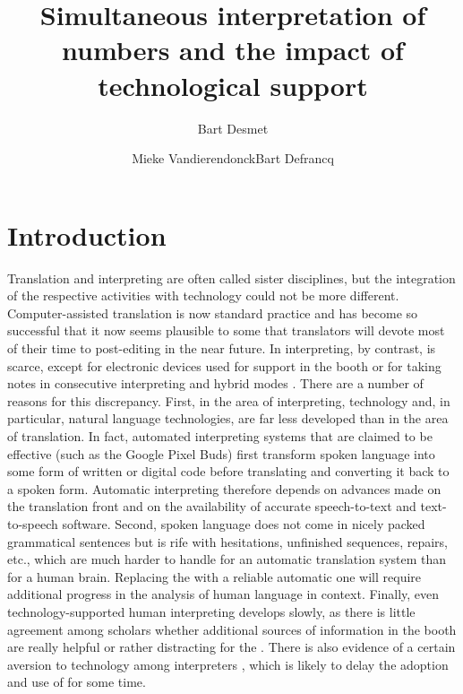 \documentclass[output=paper]{langsci/langscibook}
\title{Simultaneous interpretation of numbers and the impact of technological support}
\author{Bart Desmet\affiliation{University of Ghent}\and Mieke Vandierendonck\affiliation{University of Ghent}\lastand Bart Defrancq\affiliation{University of Ghent}}
\begin{document}

 

 
\section{Introduction}
Translation and interpreting are often called sister disciplines, but the integration of the respective activities with technology could not be more different. Computer-assisted translation is now standard practice and  has become so successful that it now seems plausible to some that translators will devote most of their time to post-editing in the near future. In interpreting, by contrast,  is scarce, except for electronic devices used for  support in the booth \citep{Fantinuoli2012} or for taking notes in consecutive interpreting and hybrid modes \citep{Orlando2014,Orlando2016,Goldsmith2017}. There are a number of reasons for this discrepancy. First, in the area of interpreting, technology and, in particular, natural language technologies, are far less developed than in the area of translation. In fact, automated interpreting systems that are claimed to be effective (such as the Google Pixel Buds) first transform spoken language into some form of written or digital code before translating and converting it back to a spoken form. Automatic interpreting therefore depends on advances made on the translation front and on the availability of accurate speech-to-text and text-to-speech software. Second, spoken language does not come in nicely packed grammatical sentences but is rife with hesitations, unfinished sequences, repairs, etc., which are much harder to handle for an automatic translation system than for a human brain. Replacing the  with a reliable automatic one will require additional progress in the analysis of human language in context. Finally, even technology-supported human interpreting develops slowly, as there is little agreement among scholars whether additional sources of information in the booth are really helpful or rather distracting for the . There is also evidence of a certain aversion to technology among interpreters \citep{CorpasPastor2016}, which is likely to delay the adoption and use of  for some time. 
\end{document}
